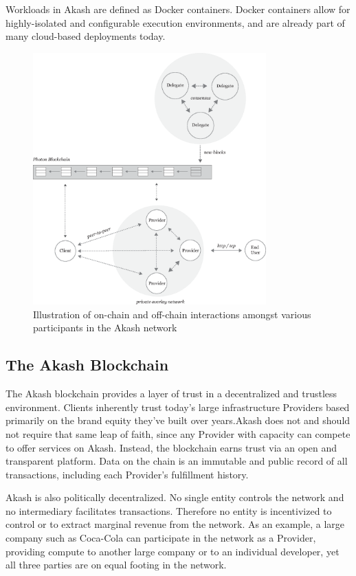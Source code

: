 \documentclass[11pt,english]{article}
\theoremstyle{definition}
\begin{document}
Workloads in Akash are defined as Docker containers. Docker containers allow for highly-isolated and configurable execution environments, and are already part of many cloud-based deployments today.
\begin{figure}[hbt]
\centering
  \includegraphics[width=0.8\textwidth]{overview}
  \caption{Illustration of on-chain and off-chain interactions amongst various participants in the Akash network}
\end{figure}

\subsection{The Akash Blockchain}
The Akash blockchain provides a layer of trust in a decentralized and trustless environment. Clients inherently trust today's large infrastructure Providers based primarily on the brand equity they've built over years.Akash does not and should not require that same leap of faith, since any Provider with capacity can compete to offer services on Akash. Instead, the blockchain earns trust via an open and transparent platform. Data on the chain is an immutable and public record of all transactions, including each Provider's fulfillment history. 

Akash is also politically decentralized.  No single entity controls the network and no intermediary facilitates transactions. Therefore no entity is incentivized to control or to extract marginal revenue from the network.  As an example, a large company such as Coca-Cola can participate in the network as a Provider, providing compute to another large company or to an individual developer, yet all three parties are on equal footing in the network.
\end{document}
